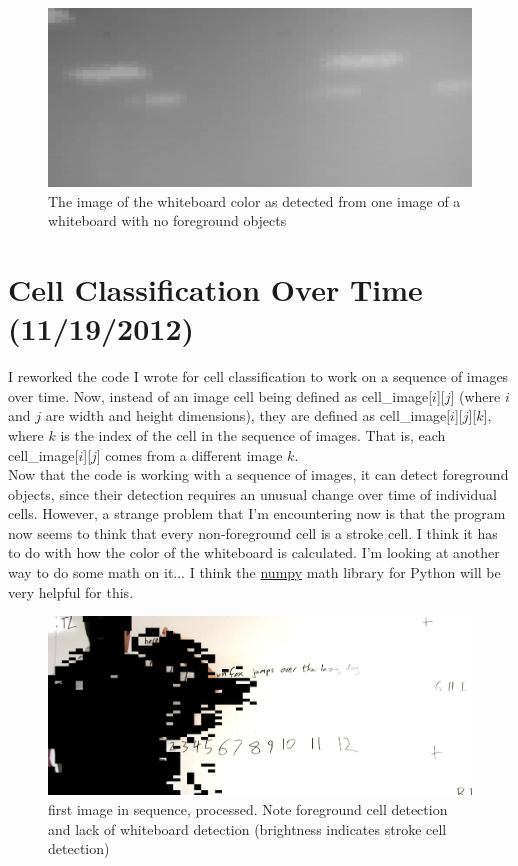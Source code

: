 \documentclass[]{article}
\begin{document}
\begin{figure}[H]
\centering
\includegraphics[scale=0.2]{images/whiteboard_single}
\caption{The image of the whiteboard color as detected from one image of a whiteboard with no foreground objects}
\end{figure}		
	\section{Cell Classification Over Time (11/19/2012)}
		I reworked the code I wrote for cell classification to work on a sequence of images over time.  Now, instead of an image cell being defined as cell\_image[$i$][$j$] (where $i$ and $j$ are width and height dimensions), they are defined as cell\_image[$i$][$j$][$k$], where $k$ is the index of the cell in the sequence of images.  That is, each cell\_image[$i$][$j$] comes from a different image $k$.  \\ 
		
		Now that the code is working with a sequence of images, it can detect foreground objects, since their detection requires an unusual change over time of individual cells.  However, a strange problem that I'm encountering now is that the program now seems to think that every non-foreground cell is a stroke cell.  I think it has to do with how the color of the whiteboard is calculated. I'm looking at another way to do some math on it... I think the \href{http://numpy.scipy.org/}{numpy} math library for Python will be very helpful for this. 
		
\begin{figure}[H]
\centering
\includegraphics[scale=0.3]{images/allstrokecells}
\caption{first image in sequence, processed. Note foreground cell detection and lack of whiteboard detection (brightness indicates stroke cell detection)}
\end{figure}
		
\end{document}
